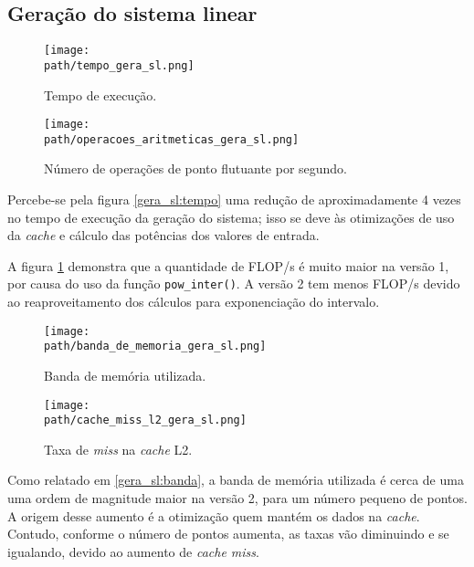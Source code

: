 \documentclass[a4paper, 11pt]{article}
\begin{document}
\subsection{Geração do sistema linear}
\label{subsecao:gera_sl}
\begin{figure}[H]
    \centering
    \begin{minipage}{.5\textwidth}
        \centering
        \texttt{[image: \\path/tempo\_gera\_sl.png]}
        \caption{Tempo de execução.}
        \label{gera_sl:tempo}
    \end{minipage}\hfill
    \begin{minipage}{.5\textwidth}
        \centering
        \texttt{[image: \\path/operacoes\_aritmeticas\_gera\_sl.png]}
        \caption{Número de operações de ponto flutuante por segundo.}
        \label{gera_sl:flops}
    \end{minipage}
\end{figure}

Percebe-se pela figura \ref{gera_sl:tempo} uma redução de aproximadamente 4 vezes
no tempo de execução da geração do sistema; isso se deve às otimizações de uso da
\textit{cache} e cálculo das potências dos valores de entrada.

A figura \ref{gera_sl:flops} demonstra que a quantidade de FLOP/s é muito
maior na versão 1, por causa do uso da função \texttt{pow\_inter()}. A versão
2 tem menos FLOP/s devido ao reaproveitamento dos cálculos para exponenciação
do intervalo.

\begin{figure}[H]
    \centering
    \begin{minipage}{.5\textwidth}
        \centering
        \texttt{[image: \\path/banda\_de\_memoria\_gera\_sl.png]}
        \caption{Banda de memória utilizada.}
        \label{gera_sl:banda}
    \end{minipage}\hfill
    \begin{minipage}{.5\textwidth}
        \centering
        \texttt{[image: \\path/cache\_miss\_l2\_gera\_sl.png]}
        \caption{Taxa de \textit{miss} na \textit{cache} L2.}
        \label{gera_sl:cache_miss}
    \end{minipage}
\end{figure}

Como relatado em \ref{gera_sl:banda}, a banda de memória utilizada é cerca de uma
uma ordem de magnitude maior na versão 2, para um número pequeno de pontos. A origem
desse aumento é a otimização quem mantém os dados na \textit{cache}. Contudo,
conforme o número de pontos aumenta, as taxas vão diminuindo e se igualando, devido
ao aumento de \textit{cache miss}.
\end{document}
